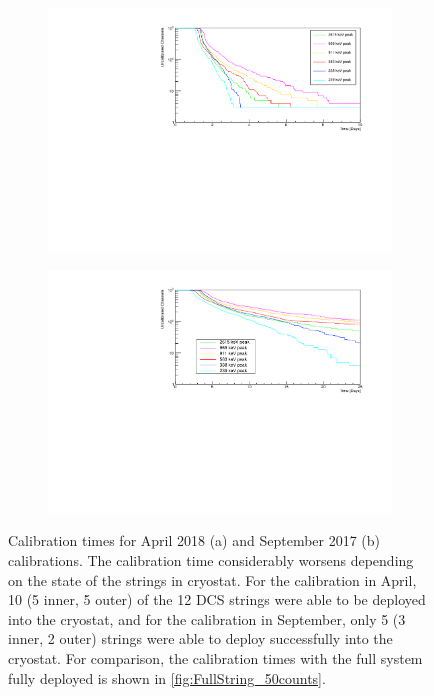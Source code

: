 \begin{figure}[htbp]
\centering
\begin{subfigure}[t]{0.9\textwidth}
\centering
\includegraphics[width=\textwidth]{Figures/April2018_50counts.pdf}
\caption{}
\label{fig:april_calibration}
\end{subfigure}
\qquad
\begin{subfigure}[t]{0.9\textwidth}
\centering
\includegraphics[width=\textwidth]{Figures/Sep2017_50counts.pdf}
\caption{}
\label{fig:september_calibration}
\end{subfigure}
\caption[Calibration times for April 2018 (a) and September 2017 (b) calibrations.]
{Calibration times for April 2018 (a) and September 2017 (b) calibrations.
The calibration time considerably worsens depending on the state of the strings in cryostat.
For the calibration in April, 10 (5 inner, 5 outer) of the 12 DCS strings were able to be deployed into the cryostat, and for the calibration in September, only 5 (3 inner, 2 outer) strings were able to deploy successfully into the cryostat.
For comparison, the calibration times with the full system fully deployed is shown in \autoref{fig:FullString_50counts}.}
\label{fig:calibrations_50counts}
\end{figure}

